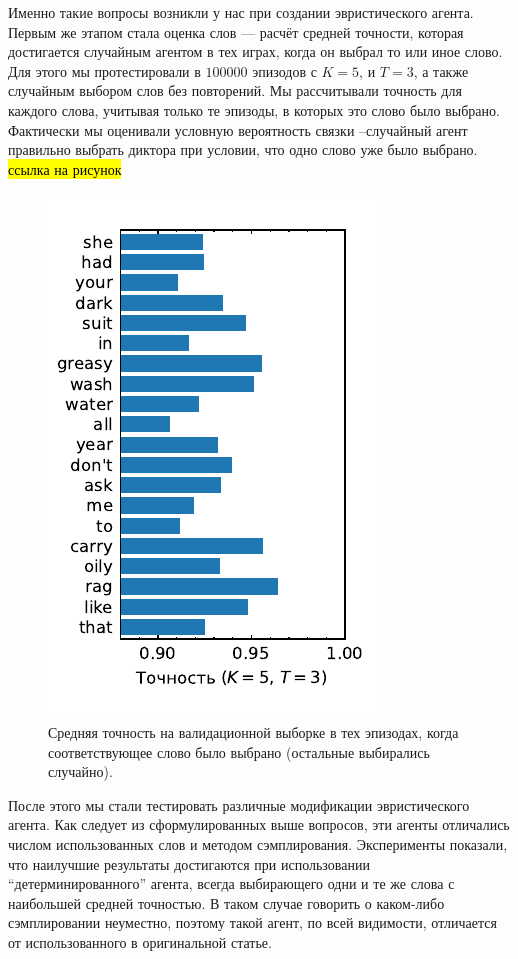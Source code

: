 Именно такие вопросы возникли у нас при создании эвристического агента. Первым
же этапом стала оценка слов --- расчёт средней точности, которая достигается
случайным агентом в тех играх, когда он выбрал то или иное слово. Для этого мы
протестировали \guesser{} в $100000$ эпизодов с $K = 5$, и $T = 3$, а также
случайным выбором слов без повторений. Мы рассчитывали точность для каждого слова,
учитывая только те эпизоды, в которых это слово было выбрано. Фактически мы оценивали
условную вероятность связки \guesser{}--случайный агент правильно выбрать диктора
при условии, что одно слово уже было выбрано. \hl{ссылка на рисунок}

\begin{figure}[htb]
    \centering
    \includegraphics[scale=1.0]{../plots/word_scores.pdf}
    \caption{Средняя точность \guesser{} на валидационной выборке в тех
    эпизодах, когда соответствующее слово было выбрано (остальные выбирались
    случайно).}
\end{figure}

После этого мы стали тестировать различные модификации эвристического агента.
Как следует из сформулированных выше вопросов, эти агенты отличались числом
использованных слов и методом сэмплирования. Эксперименты показали, что
наилучшие результаты достигаются при использовании ``детерминированного'' агента,
всегда выбирающего одни и те же слова с наибольшей средней точностью.
В таком случае говорить о каком-либо сэмплировании неуместно, поэтому такой
агент, по всей видимости, отличается от использованного в оригинальной статье.

